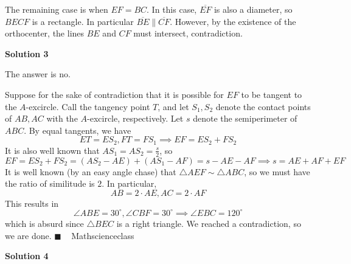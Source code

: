 \begin{enumerate}
 The remaining case is when $EF = BC$. In this case, $\overline{EF}$ is also a diameter, so $BECF$ is a rectangle. In particular $\overline{BE} \parallel \overline{CF}$. However, by the existence of the orthocenter, the lines $BE$ and $CF$ must intersect, contradiction.

 



\textbf{Solution 3}

The answer is $\boxed{\text{no}}$.

 Suppose for the sake of contradiction that it is possible for $EF$ to be tangent to the $A$-excircle. Call the tangency point $T$, and let $S_1, S_2$ denote the contact points of $AB, AC$ with the $A$-excircle, respectively. Let $s$ denote the semiperimeter of $ABC$. By equal tangents, we have 
 \[ET = ES_2, FT = FS_1 \implies EF = ES_2+FS_2\]It is also well known that $AS_1 = AS_2 = \frac{s}{2}$, so 
 \[EF = ES_2+FS_2 = (AS_2-AE)+(AS_1-AF) = s-AE-AF \implies s=AE+AF+EF\]It is well known (by an easy angle chase) that $\triangle AEF \sim \triangle ABC$, so we must have the ratio of similitude is $2$. In particular, 
 \[AB=2 \cdot AE, AC=2 \cdot AF\]This results in 
 \[\angle ABE = 30^{\circ}, \angle CBF = 30^{\circ} \implies \angle EBC = 120^{\circ}\]which is absurd since $\triangle BEC$ is a right triangle. We reached a contradiction, so we are done. $\blacksquare$ ~ Mathscienceclass

 



\textbf{Solution 4}



\end{enumerate}
